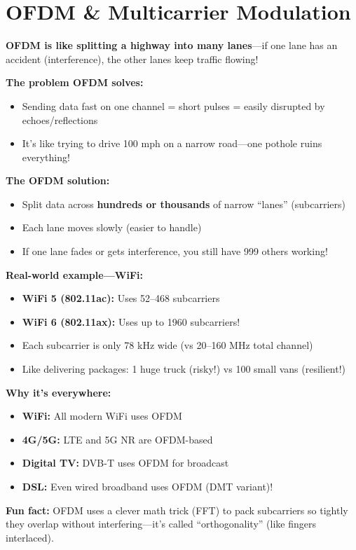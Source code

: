 \chapter{OFDM \& Multicarrier Modulation}
\label{ch:ofdm}

\begin{nontechnical}
\textbf{OFDM is like splitting a highway into many lanes}---if one lane has an accident (interference), the other lanes keep traffic flowing!

\textbf{The problem OFDM solves:}
\begin{itemize}
\item Sending data fast on one channel = short pulses = easily disrupted by echoes/reflections
\item It's like trying to drive 100 mph on a narrow road---one pothole ruins everything!
\end{itemize}

\textbf{The OFDM solution:}
\begin{itemize}
\item Split data across \textbf{hundreds or thousands} of narrow ``lanes'' (subcarriers)
\item Each lane moves slowly (easier to handle)
\item If one lane fades or gets interference, you still have 999 others working!
\end{itemize}

\textbf{Real-world example---WiFi:}
\begin{itemize}
\item \textbf{WiFi 5 (802.11ac):} Uses 52--468 subcarriers
\item \textbf{WiFi 6 (802.11ax):} Uses up to 1960 subcarriers!
\item Each subcarrier is only 78 kHz wide (vs 20--160 MHz total channel)
\item Like delivering packages: 1 huge truck (risky!) vs 100 small vans (resilient!)
\end{itemize}

\textbf{Why it's everywhere:}
\begin{itemize}
\item \textbf{WiFi:} All modern WiFi uses OFDM
\item \textbf{4G/5G:} LTE and 5G NR are OFDM-based
\item \textbf{Digital TV:} DVB-T uses OFDM for broadcast
\item \textbf{DSL:} Even wired broadband uses OFDM (DMT variant)!
\end{itemize}

\textbf{Fun fact:} OFDM uses a clever math trick (FFT) to pack subcarriers so tightly they overlap without interfering---it's called ``orthogonality'' (like fingers interlaced).
\end{nontechnical}

